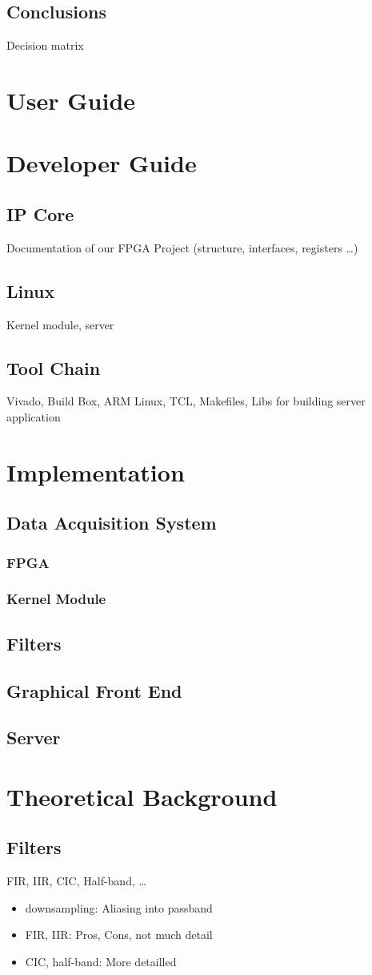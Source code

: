 \documentclass[a4paper,oneside]{alpenthesis/alpenthesis}
\begin{document}
\chapter{Conclusions}
Decision matrix


\part{User Guide}

\part{Developer Guide}
\chapter{IP Core}
Documentation of our FPGA Project (structure, interfaces, registers \ldots)
\chapter{Linux}
Kernel module, server

\chapter{Tool Chain}
Vivado, Build Box, ARM Linux, TCL, Makefiles, Libs for building server application

\part{Implementation}
\chapter{Data Acquisition System}
\section{FPGA}
\section{Kernel Module}

\chapter{Filters}
\chapter{Graphical Front End}
\chapter{Server}

\part{Theoretical Background}
\chapter{Filters}
FIR, IIR, CIC, Half-band, \ldots
\begin{itemize}
    \item downsampling: Aliasing into passband
    \item FIR, IIR: Pros, Cons, not much detail
    \item CIC, half-band: More detailled
\end{itemize}
\end{document}
